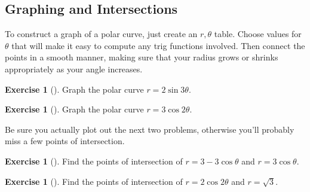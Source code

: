 \documentclass[10pt,]{book}
\theoremstyle{plain}
\theoremstyle{definition}
\theoremstyle{definition}
\theoremstyle{definition}
\theoremstyle{definition}
\newtheorem{exploration}[project]{Exercise}
\theoremstyle{definition}
\numberwithin{equation}{section}
\begin{document}
\subsection[{Graphing and Intersections}]{Graphing and Intersections}\label{subsection-20}
To construct a graph of a polar curve, just create an \(r,\theta\) table. Choose values for \(\theta\) that will make it easy to compute any trig functions involved. Then connect the points in a smooth manner, making sure that your radius grows or shrinks appropriately as your angle increases.%
\begin{exploration}[]\label{exploration-91}
Graph the polar curve \(r=2\sin 3\theta\).%
\end{exploration}
\begin{exploration}[]\label{exploration-92}
Graph the polar curve \(r=3\cos 2\theta\).%
\end{exploration}
Be sure you actually plot out the next two problems, otherwise you'll probably miss a few points of intersection.%
\begin{exploration}[]\label{exploration-93}
Find the points of intersection of \(r=3-3\cos\theta\) and \(r=3\cos\theta\).%
\end{exploration}
\begin{exploration}[]\label{exploration-94}
Find the points of intersection of \(r=2\cos 2\theta\) and \(r=\sqrt 3\).%
\end{exploration}
\typeout{************************************************}
\typeout{************************************************}
\end{document}
